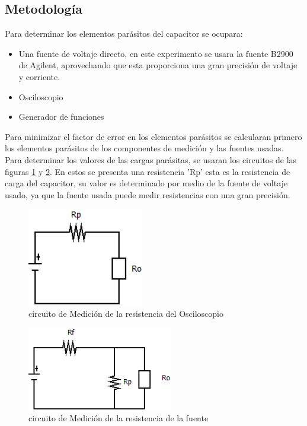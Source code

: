\documentclass[journal]{IEEEtran}
\begin{document}
 \subsection{Metodología}
 Para determinar los elementos parásitos del capacitor se ocupara:
 \begin{itemize}
 	\item Una fuente de voltaje directo, en este experimento se usara la fuente B2900 de Agilent, aprovechando que esta proporciona una gran precisión de voltaje y corriente.
 	\item Osciloscopio
 	\item Generador de funciones
 \end{itemize}
 Para minimizar el factor de error en los elementos parásitos se calcularan primero los elementos parásitos de los componentes de medición y las fuentes usadas.\\ 
 Para determinar los valores de las cargas parásitas, se usaran los circuitos de las figuras \ref{fig:Medicion_Ro} y \ref{fig:Medicion_Rf}. En estos se presenta una resistencia 'Rp' esta es la resistencia de carga del capacitor, su valor es determinado por medio de la fuente de voltaje usado, ya que la fuente usada puede medir resistencias con una gran precisión.  
 
 \begin{figure}
 \centering
 \includegraphics[width=2in]{img/Medicion_Ro}
 \caption{circuito de Medición de la resistencia del Osciloscopio}
 \label{fig:Medicion_Ro}
 \end{figure}
 
  \begin{figure}
  	\centering
  	\includegraphics[width=2.5in]{img/Medicion_Rf}
  	\caption{circuito de Medición de la resistencia de la fuente}
  	\label{fig:Medicion_Rf}
  \end{figure}
  
\end{document}

